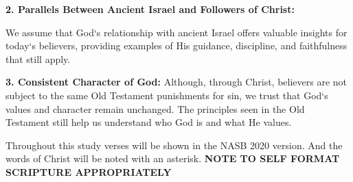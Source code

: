 \textbf{2. Parallels Between Ancient Israel and Followers of Christ:}

We assume that God`s relationship with ancient Israel offers valuable insights for today`s believers, providing examples of His guidance, discipline, and faithfulness that still apply.\\
\vspace{2\baselineskip}

\textbf{3. Consistent Character of God:} 
Although, through Christ, believers are not subject to the same Old Testament punishments for sin, we trust that God`s values and character remain unchanged. The principles seen in the Old Testament still help us understand who God is and what He values.\\

\vspace{2\baselineskip}

Throughout this study verses will be shown in the NASB 2020 version. And the words of Christ will be noted with an asterisk.
\textbf{NOTE TO SELF FORMAT SCRIPTURE APPROPRIATELY}
